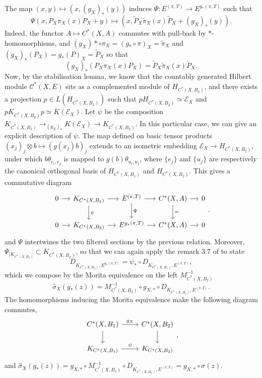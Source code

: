 \begin{dem}
\begin{enumerate}
The map $(x,y)\mapsto (x, (g_X)_*(y))$ induces $\Psi :E^{(\pi,T)}\rightarrow  E^{g_*(\pi,T)} $ such that
\[\Psi(x,P_X \pi_X(x) P_X +y)\mapsto (x,\tilde P_X \tilde\pi_X(x) \tilde P_X+(g_X)_*(y)).\]
Indeed, the functor $A\mapsto C^*(X,A)$ commutes with pull-back by $*$-homomorphisms, and $(g_X)*\circ\pi_X=(g_*\circ\pi)_X=\tilde \pi_X$ and $(g_X)_*(P_X) = g_*(P)_X=\tilde P_X$ so that 
\[(g_X)_*(P_X \pi_X(x) P_X)=\tilde P_X \tilde\pi_X(x) \tilde P_X. \]
Now, by the stabilisation lemma, we know that the countably generated Hilbert module $\mathcal C^*(X,E)$ sits as a complemented module of $H_{C^*(X,B_2)}$, and there exists a projection $p\in L(H_{C^*(X,B_2)})$ such that $pH_{C^*(X,B_2)}\simeq \mathcal E_X$ and $pK_{C^*(X,B_2)}p\simeq K(\mathcal E_X)$. Let $\psi$ be the composition $K_{C^*(X,B_1)}\rightarrow_{(g_X)_*} K(\mathcal E_X)\rightarrow K_{C^*(X,B_2)}$. In this particular case, we can give an explicit description of $\psi$. The map defined on basic tensor products $(x_j)_{j}\otimes b\mapsto (g(x_j)b)_j $ extends to an isometric embedding $\mathcal E_X \rightarrow H_{C^*(X,B_2)}$, under which $ b\theta_{e_i,e_j}$ is mapped to $g(b)\theta_{u_i,u_j}$, where $\{e_j\}$ and $\{u_j\}$ are respectively the canonical orthogonal basis of $H_{C^*(X,B_1)}$ and $H_{C^*(X,B_2)}$. This gives a commutative diagram 
\[\begin{tikzcd}[column sep = small]
0\arrow{r} & K_{C^*(X,B_1)}\arrow{r}\arrow{d}{\psi} & E^{(\pi,T)} \arrow{r}\arrow{d}{\Psi}& C^*(X,A)\arrow{r}\arrow{d}{=} & 0\\
0\arrow{r} & K_{C^*(X,B_2)}\arrow{r} & E^{g_*(\pi,T)} \arrow{r}& C^*(X,A)\arrow{r} & 0
\end{tikzcd}.\]
and $\Psi$ intertwines the two filtered sections by the previous relation. Moreover, $\Psi_{|K_{C^*(X,B_1)}}\subset K_{C^*(X,B_2)}$, so that we can again apply the remark $3.7$ of \cite{OY2} to state
\[ D_{K_{C^*(X,B_2)},E^{g_*(\pi,T)}}=\psi_*\circ D_{K_{C^*(X,B_1)},E^{(\pi,T)}},\]
which we compose by the Morita equivalence on the left $M_{C^*(X,B_2)}^{-1}$
\[\hat\sigma_X(g_*(z)) = M_{C^*(X,B_2)}^{-1}\circ g_{X,*}\circ D_{K_{C^*(X,B_1)},E^{(\pi,T)}}.\]
The homomorphisms inducing the Morita equivalence make the following diagram commutes,
\[\begin{tikzcd}C^*(X,B_1)\arrow{r}{g_X}\arrow{d} & C^*(X,B_2)\arrow{d} \\ K_{C^*(X,B_1)} \arrow{r}{\psi}& K_{C^*(X,B_2)}\end{tikzcd},\]
and $\hat\sigma_X(g_*(z))= g_{X,*}\circ M_{C^*(X,B_1)}^{-1}\circ D_{K_{C^*(X,B_1)},E^{(\pi,T)}}=g_{X,*}\circ \hat\sigma(z)$.\\


\end{enumerate}
\end{dem}
